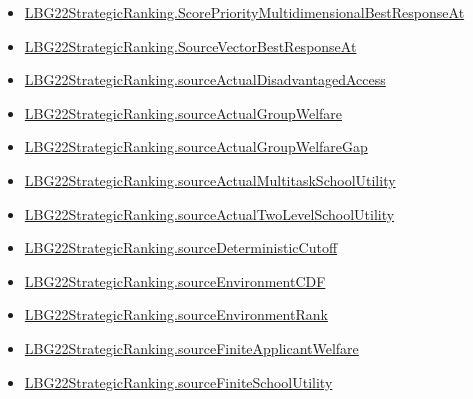 \documentclass[10pt]{article}
\begin{document}
\begin{itemize}[leftmargin=1.2em]
\begin{itemize}[leftmargin=1.2em]
\item \hyperlink{paper-prerequisite-fe9ea55a34d7ea9c}{LBG22\allowbreak{}Strategic\allowbreak{}Ranking.\allowbreak{}Score\allowbreak{}Priority\allowbreak{}Multidimensional\allowbreak{}Best\allowbreak{}Response\allowbreak{}At}
\item \hyperlink{paper-prerequisite-b0c4f18b812a40f1}{LBG22\allowbreak{}Strategic\allowbreak{}Ranking.\allowbreak{}Source\allowbreak{}Vector\allowbreak{}Best\allowbreak{}Response\allowbreak{}At}
\item \hyperlink{paper-prerequisite-6f1ee9b200124096}{LBG22\allowbreak{}Strategic\allowbreak{}Ranking.\allowbreak{}source\allowbreak{}Actual\allowbreak{}Disadvantaged\allowbreak{}Access}
\item \hyperlink{paper-prerequisite-22c0ae11547a174a}{LBG22\allowbreak{}Strategic\allowbreak{}Ranking.\allowbreak{}source\allowbreak{}Actual\allowbreak{}Group\allowbreak{}Welfare}
\item \hyperlink{paper-prerequisite-d3e90f3908818ca5}{LBG22\allowbreak{}Strategic\allowbreak{}Ranking.\allowbreak{}source\allowbreak{}Actual\allowbreak{}Group\allowbreak{}Welfare\allowbreak{}Gap}
\item \hyperlink{paper-prerequisite-c194f1bd51c4a4cc}{LBG22\allowbreak{}Strategic\allowbreak{}Ranking.\allowbreak{}source\allowbreak{}Actual\allowbreak{}Multitask\allowbreak{}School\allowbreak{}Utility}
\item \hyperlink{paper-prerequisite-9d0a441d993fe3f2}{LBG22\allowbreak{}Strategic\allowbreak{}Ranking.\allowbreak{}source\allowbreak{}Actual\allowbreak{}Two\allowbreak{}Level\allowbreak{}School\allowbreak{}Utility}
\item \hyperlink{paper-prerequisite-e76c8574ddaca0dc}{LBG22\allowbreak{}Strategic\allowbreak{}Ranking.\allowbreak{}source\allowbreak{}Deterministic\allowbreak{}Cutoff}
\item \hyperlink{paper-prerequisite-1aae1cdeecf21463}{LBG22\allowbreak{}Strategic\allowbreak{}Ranking.\allowbreak{}source\allowbreak{}Environment\allowbreak{}CDF}
\item \hyperlink{paper-prerequisite-b308d7da226a5fe1}{LBG22\allowbreak{}Strategic\allowbreak{}Ranking.\allowbreak{}source\allowbreak{}Environment\allowbreak{}Rank}
\item \hyperlink{paper-prerequisite-7fb5250e464d0736}{LBG22\allowbreak{}Strategic\allowbreak{}Ranking.\allowbreak{}source\allowbreak{}Finite\allowbreak{}Applicant\allowbreak{}Welfare}
\item \hyperlink{paper-prerequisite-25a6dc17f260546b}{LBG22\allowbreak{}Strategic\allowbreak{}Ranking.\allowbreak{}source\allowbreak{}Finite\allowbreak{}School\allowbreak{}Utility}

\end{itemize}
\end{itemize}
\end{document}
